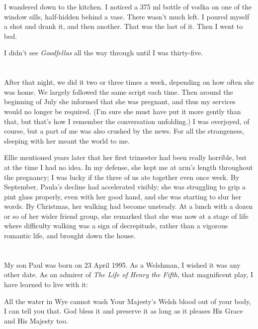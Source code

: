I wandered down to the kitchen. I noticed a 375 ml bottle of vodka on one of the window sills, half-hidden behind a vase. There wasn't much left. I poured myself a shot and drank it, and then another. That was the last of it. Then I went to bed.

I didn't see \textit{Goodfellas} all the way through until I was thirty-five.

\section{}

After that night, we did it two or three times a week, depending on how often she was home. We largely followed the same script each time. Then around the beginning of July she informed that she was pregnant, and thus my services would no longer be required. (I'm sure she must have put it more gently than that, but that's how I remember the conversation unfolding.) I was overjoyed, of course, but a part of me was also crushed by the news. For all the strangeness, sleeping with her meant the world to me.

Ellie mentioned years later that her first trimester had been really horrible, but at the time I had no idea. In my defense, she kept me at arm's length throughout the pregnancy; I was lucky if the three of us ate together even once week. By September, Paula's decline had accelerated visibly; she was struggling to grip a pint glass properly, even with her good hand, and she was starting to slur her words. By Christmas, her walking had become unsteady. At a lunch with a dozen or so of her wider friend group, she remarked that she was now at a stage of life where difficulty walking was a sign of decrepitude, rather than a vigorous romantic life, and brought down the house.

\section{}

My son Paul was born on 23 April 1995. As a Welshman, I wished it was any other date. As an admirer of \textit{The Life of Henry the Fifth}, that magnificent play, I have learned to live with it:

\begin{quoting}
    All the water in Wye cannot wash Your Majesty's Welsh blood out of your body, I can tell you that. God bless it and preserve it as long as it pleases His Grace and His Majesty too.
\end{quoting}


